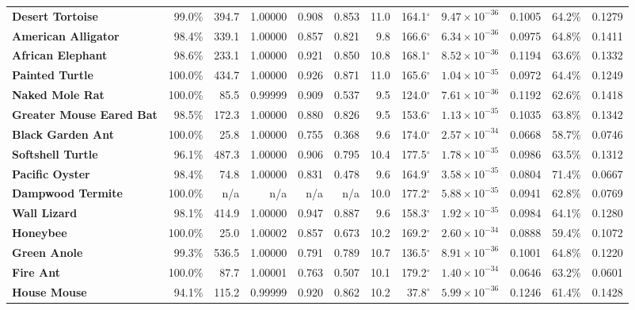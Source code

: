 \documentclass[11pt,a4paper]{article}
\renewcommand{\_}{\origunderscore\penalty200\relax}
\theoremstyle{remark}
\begin{document}
\begin{table}[H]
{{\begin{tabular}{lrrrrrrrrrrr}
\textbf{Desert Tortoise} & 99.0\% & 394.7 & 1.00000 & 0.908 & 0.853 & 11.0 & 164.1$^\circ$ & $9.47 \times 10^{-36}$ & 0.1005 & 64.2\% & 0.1279 \\
\textbf{American Alligator} & 98.4\% & 339.1 & 1.00000 & 0.857 & 0.821 & 9.8 & 166.6$^\circ$ & $6.34 \times 10^{-36}$ & 0.0975 & 64.8\% & 0.1411 \\
\textbf{African Elephant} & 98.6\% & 233.1 & 1.00000 & 0.921 & 0.850 & 10.8 & 168.1$^\circ$ & $8.52 \times 10^{-36}$ & 0.1194 & 63.6\% & 0.1332 \\
\textbf{Painted Turtle} & 100.0\% & 434.7 & 1.00000 & 0.926 & 0.871 & 11.0 & 165.6$^\circ$ & $1.04 \times 10^{-35}$ & 0.0972 & 64.4\% & 0.1249 \\
\textbf{Naked Mole Rat} & 100.0\% & 85.5 & 0.99999 & 0.909 & 0.537 & 9.5 & 124.0$^\circ$ & $7.61 \times 10^{-36}$ & 0.1192 & 62.6\% & 0.1418 \\
\textbf{Greater Mouse Eared Bat} & 98.5\% & 172.3 & 1.00000 & 0.880 & 0.826 & 9.5 & 153.6$^\circ$ & $1.13 \times 10^{-35}$ & 0.1035 & 63.8\% & 0.1342 \\
\textbf{Black Garden Ant} & 100.0\% & 25.8 & 1.00000 & 0.755 & 0.368 & 9.6 & 174.0$^\circ$ & $2.57 \times 10^{-34}$ & 0.0668 & 58.7\% & 0.0746 \\
\textbf{Softshell Turtle} & 96.1\% & 487.3 & 1.00000 & 0.906 & 0.795 & 10.4 & 177.5$^\circ$ & $1.78 \times 10^{-35}$ & 0.0986 & 63.5\% & 0.1312 \\
\textbf{Pacific Oyster} & 98.4\% & 74.8 & 1.00000 & 0.831 & 0.478 & 9.6 & 164.9$^\circ$ & $3.58 \times 10^{-35}$ & 0.0804 & 71.4\% & 0.0667 \\
\textbf{Dampwood Termite} & 100.0\% & n/a & n/a & n/a & n/a & 10.0 & 177.2$^\circ$ & $5.88 \times 10^{-35}$ & 0.0941 & 62.8\% & 0.0769 \\
\textbf{Wall Lizard} & 98.1\% & 414.9 & 1.00000 & 0.947 & 0.887 & 9.6 & 158.3$^\circ$ & $1.92 \times 10^{-35}$ & 0.0984 & 64.1\% & 0.1280 \\
\textbf{Honeybee} & 100.0\% & 25.0 & 1.00002 & 0.857 & 0.673 & 10.2 & 169.2$^\circ$ & $2.60 \times 10^{-34}$ & 0.0888 & 59.4\% & 0.1072 \\
\textbf{Green Anole} & 99.3\% & 536.5 & 1.00000 & 0.791 & 0.789 & 10.7 & 136.5$^\circ$ & $8.91 \times 10^{-36}$ & 0.1001 & 64.8\% & 0.1220 \\
\textbf{Fire Ant} & 100.0\% & 87.7 & 1.00001 & 0.763 & 0.507 & 10.1 & 179.2$^\circ$ & $1.40 \times 10^{-34}$ & 0.0646 & 63.2\% & 0.0601 \\
\textbf{House Mouse} & 94.1\% & 115.2 & 0.99999 & 0.920 & 0.862 & 10.2 & 37.8$^\circ$ & $5.99 \times 10^{-36}$ & 0.1246 & 61.4\% & 0.1428 \\

\end{tabular}}}
\end{table}
\end{document}
